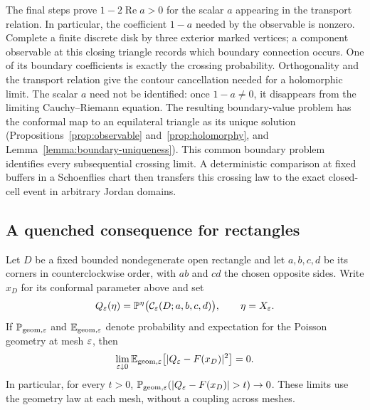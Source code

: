 The final steps prove $1-2\operatorname{Re}a>0$ for the scalar $a$
appearing in the transport relation. In particular, the coefficient
$1-a$ needed by the observable is nonzero. Complete a finite discrete
disk by three exterior marked vertices; a component observable at this
closing triangle records which boundary connection occurs. One of its
boundary coefficients is exactly the crossing probability. Orthogonality
and the transport relation give the contour cancellation needed for a
holomorphic limit. The scalar $a$ need not be identified: once
$1-a\ne0$, it disappears from the limiting Cauchy--Riemann equation.
The resulting boundary-value problem has the conformal map to an
equilateral triangle as its unique solution
(Propositions~\ref{prop:observable} and~\ref{prop:holomorphy}, and
Lemma~\ref{lemma:boundary-uniqueness}). This common boundary problem
identifies every subsequential crossing limit.
A deterministic comparison at fixed buffers in a Schoenflies chart then
transfers this crossing law to the exact closed-cell event in arbitrary
Jordan domains.

\subsection{A quenched consequence for rectangles}

\begin{corollary}\label{cor:quenched-rectangles}
Let $D$ be a fixed bounded nondegenerate open rectangle and let $a,b,c,d$
be its corners in counterclockwise order, with $ab$ and $cd$ the chosen
opposite sides. Write $x_D$ for its conformal parameter above and set
\[
 Q_\varepsilon(\eta)=\mathbb P^{\eta}\bigl(\mathcal C_\varepsilon(D;a,b,c,d)\bigr),
 \qquad \eta=X_\varepsilon.
\]
If $\mathbb P_{\mathrm{geom},\varepsilon}$ and $\mathbb E_{\mathrm{geom},\varepsilon}$ denote
probability and expectation for the Poisson geometry at mesh $\varepsilon$, then
\[
 \lim_{\varepsilon\downarrow0}
 \mathbb E_{\mathrm{geom},\varepsilon}\bigl[|Q_\varepsilon-F(x_D)|^2\bigr]=0.
\]
In particular, for every $t>0$,
$\PP_{\mathrm{geom},\eps}(|Q_\eps-F(x_D)|>t)\to0$.
These limits use the geometry law at each mesh, without a coupling across
meshes.
\end{corollary}

